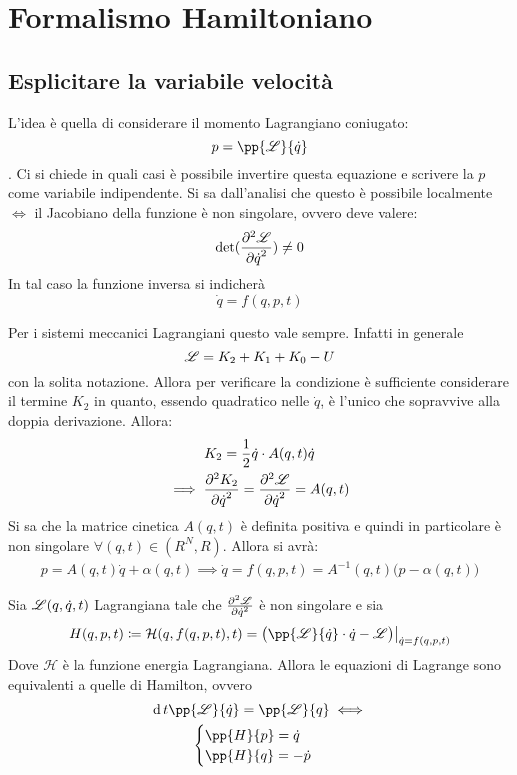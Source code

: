 \documentclass[Main.tex]{subfiles}
\begin{document}
\section{Formalismo Hamiltoniano}
\toc

\subsection{Esplicitare la variabile velocità}
L'idea è quella di considerare il momento Lagrangiano coniugato: $$p = \pp{\L}{\dot q}$$. Ci si chiede in quali casi è possibile invertire questa equazione e scrivere la $p$ come variabile indipendente. Si sa dall'analisi che questo è possibile localmente $\iff$ il Jacobiano della funzione è non singolare, ovvero deve valere: 
\begin{equation}
\mathrm{det}(\frac{\partial^2 \mathscr{L}}{{\partial \dot q}^2}) \neq 0    
\end{equation}
In tal caso la funzione inversa si indicherà 
\begin{equation}
\dot q = f(q,p,t)    
\end{equation}
\begin{osservazione}
    Per i sistemi meccanici Lagrangiani questo vale sempre. Infatti in generale $$\mathscr{L} = K_2 + K_1 + K_0 - U$$ con la solita notazione. Allora per verificare la condizione è sufficiente considerare il termine $K_2$ in quanto, essendo quadratico nelle $\dot q$, è l'unico che sopravvive alla doppia derivazione. Allora:
    \begin{gather}
        K_2 = \frac{1}{2} \dot q \cdot A(q,t) \dot q \\ \implies
        \frac{\partial^2 K_2}{{\partial \dot q}^2} = \frac{\partial^2 \mathscr{L}}{{\partial \dot q}^2} = A(q,t)
    \end{gather}
    Si sa che la matrice cinetica $A(q,t)$ è definita positiva e quindi in particolare è non singolare $\forall (q,t) \in (R^N, R)$.
    Allora si avrà:
    \begin{gather}
        p = A(q,t)\dot q + \alpha(q,t) \implies \dot q = f(q,p,t) = A^{-1}(q,t)\big( p - \alpha(q,t) \big)
    \end{gather}
\end{osservazione}
\begin{pro}
    Sia $\mathscr{L}(q,\dot q, t)$ Lagrangiana tale che $\frac{\partial^2 \mathscr{L}}{{\partial \dot q}^2}$ è non singolare e sia $$H(q,p,t) \coloneq \mathcal{H}(q,f(q,p,t), t) = \big( \pp{\L}{\dot q} \cdot \dot q - \L \big) \big\rvert_{\dot q = f(q,p,t)}$$
    Dove $\mathcal{H}$ è la funzione energia Lagrangiana. Allora le equazioni di Lagrange sono equivalenti a quelle di Hamilton, ovvero 
    \begin{gather}
        \dd{}{t}\pp{\L}{\dot q} = \pp {\L}{q} \iff  \\ \begin{cases} 
          \pp {H}{p} = \dot q \\
          \pp {H}{q} = - \dot p\\
       \end{cases}
    \end{gather}
\end{pro}
\end{document}
